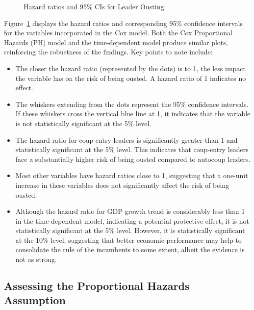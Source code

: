 \documentclass[
  12pt,
]{report}
\begin{document}
\begin{figure}
\begin{minipage}{0.50\linewidth}
{}


\end{minipage}%

\caption{\label{fig-coxHR}Hazard ratios and 95\% CIs for Leader Ousting}

\end{figure}%

Figure~\ref{fig-coxHR} displays the hazard ratios and corresponding 95\%
confidence intervals for the variables incorporated in the Cox model.
Both the Cox Proportional Hazards (PH) model and the time-dependent
model produce similar plots, reinforcing the robustness of the findings.
Key points to note include:

\begin{itemize}
\item
  The closer the hazard ratio (represented by the dots) is to 1, the
  less impact the variable has on the risk of being ousted. A hazard
  ratio of 1 indicates no effect.
\item
  The whiskers extending from the dots represent the 95\% confidence
  intervals. If these whiskers cross the vertical blue line at 1, it
  indicates that the variable is not statistically significant at the
  5\% level.
\item
  The hazard ratio for coup-entry leaders is significantly greater than
  1 and statistically significant at the 5\% level. This indicates that
  coup-entry leaders face a substantially higher risk of being ousted
  compared to autocoup leaders.
\item
  Most other variables have hazard ratios close to 1, suggesting that a
  one-unit increase in these variables does not significantly affect the
  risk of being ousted.
\item
  Although the hazard ratio for GDP growth trend is considerably less
  than 1 in the time-dependent model, indicating a potential protective
  effect, it is not statistically significant at the 5\% level. However,
  it is statistically significant at the 10\% level, suggesting that
  better economic performance may help to consolidate the rule of the
  incumbents to some extent, albeit the evidence is not as strong.
\end{itemize}

\subsection{Assessing the Proportional Hazards
Assumption}\label{assessing-the-proportional-hazards-assumption}
\end{document}
